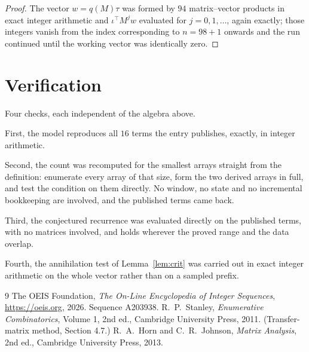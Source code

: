 \documentclass[11pt,a4paper]{article}
\theoremstyle{plain}
\theoremstyle{definition}
\begin{document}
\begin{proof}
The vector $w=q(M)\tau$ was formed by $94$ matrix--vector products in exact integer
arithmetic and $\iota^{\!\top}M^{j}w$ evaluated for $j=0,1,\dots$, again exactly; those
integers vanish from the index corresponding to $n=98+1$ onwards and the run continued
until the working vector was identically zero.
\end{proof}

\section{Verification}

Four checks, each independent of the algebra above.

First, the model reproduces all $16$ terms the entry publishes, exactly, in integer
arithmetic.

Second, the count was recomputed for the smallest arrays straight from the definition:
enumerate every array of that size, form the two derived arrays in full, and test the condition
on them directly. No window, no state and no incremental bookkeeping are involved, and the
published terms came back.

Third, the conjectured recurrence was evaluated directly on the published terms, with no
matrices involved, and holds wherever the proved range and the data overlap.

Fourth, the annihilation test of Lemma~\ref{lem:crit} was carried out in exact integer
arithmetic on the whole vector rather than on a sampled prefix.

\begin{thebibliography}{9}
 The OEIS Foundation, \emph{The On-Line Encyclopedia of Integer
Sequences}, \url{https://oeis.org}, 2026. Sequence A203938.
 R.~P.~Stanley, \emph{Enumerative Combinatorics}, Volume 1, 2nd ed.,
Cambridge University Press, 2011. (Transfer-matrix method, Section 4.7.)
 R.~A.~Horn and C.~R.~Johnson, \emph{Matrix Analysis}, 2nd ed., Cambridge
University Press, 2013.
\end{thebibliography}
\end{document}
